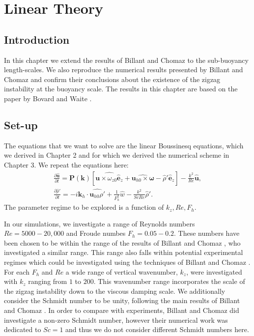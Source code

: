 \chapter{Linear Theory}

\section{Introduction}
In this chapter we extend the results of Billant and Chomaz \cite{bc2000c} to the sub-buoyancy length-scales. We also reproduce the numerical results presented by Billant and Chomaz and confirm their conclusions about the existence of the zigzag instability at the buoyancy scale. The results in this chapter are based on the paper by Bovard and Waite \cite{bovard2013}.

\section{Set-up}
The equations that we want to solve are the linear Boussinesq equations, which we derived in Chapter 2 and for which we derived the numerical scheme in Chapter 3. We repeat the equations here:
\begin{align}
\frac{\partial \hat{\bm{u}}}{\partial t} = \textbf{P}(\textbf{k})[\widehat{\bm{u}\times \omega_{z0}\hat{\bm{e}}_{z}} + \widehat{\bm{u}_{h0}\times\bm{\omega}}-\hat{\rho}'\hat{\bm{e}}_{z}] - \frac{k^{2}}{Re}\hat{\bm{u}},\label{solve1}\\
\frac{\partial\hat{\rho}'}{\partial t} = -i\bm{k}_{h}\cdot\widehat{\bm{u}_{h0}\rho'} + \frac{1}{F_{h}^{2}}\hat{w}- \frac{k^{2}}{ScRe}\hat{\rho}'.
\end{align} 
The parameter regime to be explored is a function of $k_{z},Re,F_{h}$. 

In our simulations, we investigate a range of Reynolds numbers $Re=5000-20{,}000$ and Froude numbes $F_{h}=0.05-0.2$. These numbers have been chosen to be within the range of the results of Billant and Chomaz \cite{bc2000c}, who investigated a similar range. This range also falls within potential experimental regimes which could be investigated using the techniques of Billant and Chomaz \cite{bc2000a}. For each $F_{h}$ and $Re$ a wide range of vertical wavenumber, $k_{z}$, were investigated with $k_{z}$ ranging from $1$ to $200$. This wavenumber range incorporates the scale of the zigzag instability down to the viscous damping scale. We additionally consider the Schmidt number to be unity, following the main results of Billant and Chomaz \cite{bc2000c}. In order to compare with experiments, Billant and Chomaz did investigate a non-zero Schmidt number, however their numerical work was dedicated to $Sc=1$ and thus we do not consider different Schmidt numbers here. 

